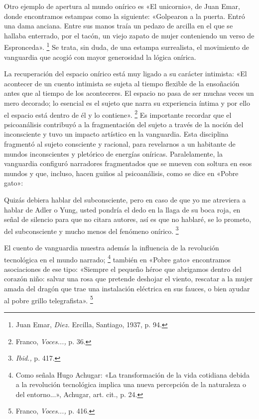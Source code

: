 \documentclass[14pt,twoside,final]{extbook} %
\let\oldfootnote\footnote
\renewcommand\footnote[1]{%
\oldfootnote{\hspace{1mm}#1}}
\begin{document}
Otro ejemplo de apertura al mundo onírico es «El unicornio», de Juan Emar, donde encontramos estampas como la siguiente: «Golpearon a la puerta. Entró una dama anciana. Entre sus manos traía un pedazo de arcilla en el que se hallaba enterrado, por el tacón, un viejo zapato de mujer conteniendo un verso de Espronceda».\footnote{Juan Emar, \emph{Diez.} Ercilla, Santiago, 1937, p. 94.} Se trata, sin duda, de una estampa surrealista, el movimiento de vanguardia que acogió con mayor generosidad la lógica onírica.

La recuperación del espacio onírico está muy ligado a su carácter intimista: «El acontecer de un cuento intimista se sujeta al tiempo flexible de la ensoñación antes que al tiempo de los aconteceres. El espacio no pasa de ser muchas veces un mero decorado; lo esencial es el sujeto que narra su experiencia íntima y por ello el espacio está dentro de él y lo contiene».\footnote{Franco, \emph{Voces...,} p. 36.} Es importante recordar que el psicoanálisis contribuyó a la fragmentación del sujeto a través de la noción del inconsciente y tuvo un impacto artístico en la vanguardia. Esta disciplina fragmentó al sujeto consciente y racional, para revelarnos a un habitante de mundos inconscientes y pletórico de energías oníricas. Paralelamente, la vanguardia configuró narradores fragmentados que se mueven con soltura en esos mundos y que, incluso, hacen guiños al psicoanálisis, como se dice en «Pobre gato»:
\begin{quoting}
Quizás debiera hablar del subconsciente, pero en caso de que yo me atreviera a hablar de Adler o Yung, usted pondría el dedo en la llaga de su boca roja, en señal de silencio para que no citara autores, así es que no hablaré, se lo prometo, del subconsciente y mucho menos del fenómeno onírico.\footnote{\emph{Ibid.,} p. 417.}
\end{quoting}
El cuento de vanguardia muestra además la influencia de la revolución tecnológica en el mundo narrado;\footnote{Como señala Hugo Achugar: «La transformación de la vida cotidiana debida a la
revolución tecnológica implica una nueva percepción de la naturaleza o del entorno...», Achugar, art. cit., p. 24.} también en «Pobre gato» encontramos asociaciones de ese tipo: «Siempre el pequeño héroe que abrigamos dentro del corazón niño: salvar una rosa que pretende deshojar el viento, rescatar a la mujer amada del dragón que trae una instalación eléctrica en sus fauces, o bien ayudar al pobre grillo telegrafista».\footnote{Franco, \emph{Voces...,} p. 416.}
\end{document}
